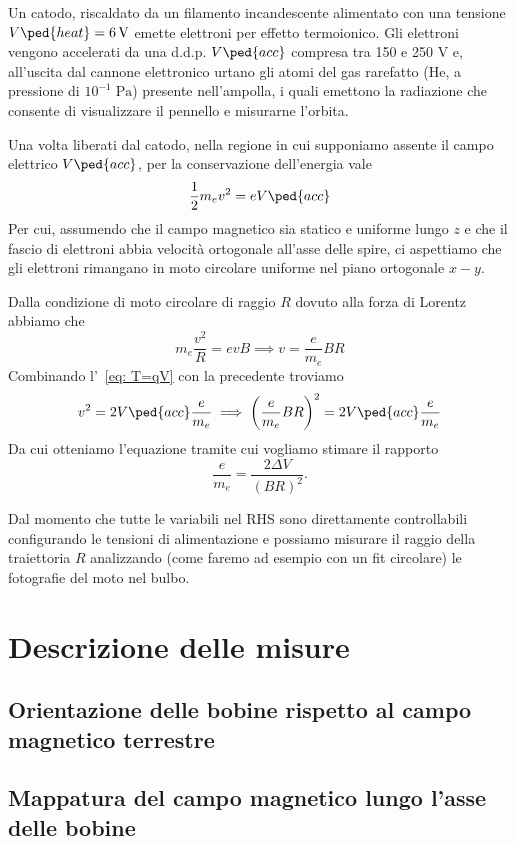 \documentclass[10pt, a4paper, italian]{article}
\begin{document}
Un catodo, riscaldato da un filamento incandescente alimentato con una
tensione $V\ped{heat} = \SI{6}{\V}$ emette elettroni per effetto termoionico.
Gli elettroni vengono accelerati da una d.d.p. $V\ped{acc}$ compresa tra 150
e 250 V e, all'uscita dal cannone elettronico urtano gli atomi del gas
rarefatto (He, a pressione di $10^{-1} \; \si{\Pa}$) presente nell'ampolla,
i quali emettono la radiazione che consente di visualizzare il pennello e
misurarne l'orbita.

Una volta liberati dal catodo, nella regione in cui supponiamo assente il
campo elettrico $V\ped{acc}$, per la conservazione dell'energia vale
\begin{equation}\label{eq: T=qV}
    \frac{1}{2} m_{e} v^{2} = e V\ped{acc}
\end{equation}
Per cui, assumendo che il campo magnetico sia statico e uniforme lungo $z$ e
che il fascio di elettroni abbia velocità ortogonale all'asse delle spire,
ci aspettiamo che gli elettroni rimangano in moto circolare uniforme nel
piano ortogonale $x-y$.

Dalla condizione di moto circolare di raggio $R$ dovuto alla forza di Lorentz
abbiamo che
\[
m_{e} \frac{v^2}{R} = e v B \implies v = \frac{e}{m_e} B R
\]
Combinando l'~\cref{eq: T=qV} con la precedente troviamo
\[
v^2 = 2 V\ped{acc} \frac{e}{m_e} \implies \left(\frac{e}{m_e} B R\right)^2 =
2 V\ped{acc} \frac{e}{m_e}
\]
Da cui otteniamo l'equazione tramite cui vogliamo stimare il rapporto
\begin{equation}\label{eq:fit}
\frac{e}{m_{e}} = \frac{2 \Delta V}{(BR)^2}.
\end{equation}

Dal momento che tutte le variabili nel RHS sono direttamente controllabili
configurando le tensioni di alimentazione e possiamo misurare il raggio
della traiettoria $R$ analizzando (come faremo ad esempio con un fit
circolare) le fotografie del moto nel bulbo.

\section{Descrizione delle misure}
\subsection{Orientazione delle bobine rispetto al campo magnetico terrestre}

\subsection{Mappatura del campo magnetico lungo l'asse delle bobine}
\end{document}
